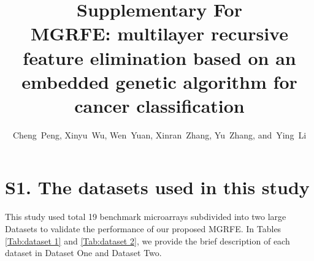 \documentclass[10pt,journal,compsoc]{IEEEtran}
\begin{document}
	\title{Supplementary For\\
		MGRFE: multilayer recursive feature elimination based on an embedded genetic algorithm for cancer classification}
	
	\author{Cheng~Peng,
		Xinyu~Wu,
		Wen~Yuan,
		Xinran~Zhang,
		Yu~Zhang,
		and~Ying~Li
		}


	\maketitle
	
	\section*{S1. The datasets used in this study}
	This study used total 19 benchmark microarrays subdivided into two large Datasets to validate the performance of our proposed MGRFE. In Tables \ref{Tab:dataset 1} and \ref{Tab:dataset 2}, we provide the brief description of each dataset in Dataset One and Dataset Two.
\end{document}
